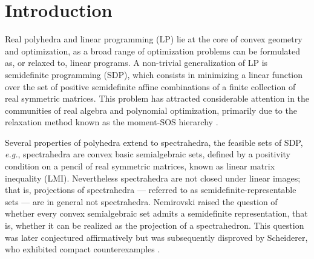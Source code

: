 \documentclass[sigconf]{acmart}
\begin{document}



\maketitle

\section{Introduction}
\label{sec:intro}

Real polyhedra and linear programming (LP) lie at the core
of convex geometry and optimization, as a broad range
of optimization problems can be formulated as, or relaxed to, linear programs.
A non-trivial generalization of LP is semidefinite programming (SDP),
which consists in minimizing a linear function over the set of
positive semidefinite affine combinations of a finite collection of
real symmetric matrices.
This problem has attracted considerable attention in the
communities of real algebra and polynomial optimization,
primarily due to the relaxation method known as the moment-SOS hierarchy
\cite{henrion2020moment}.

Several properties of polyhedra extend to spectrahedra, the feasible
sets of SDP, {\it e.g.}, spectrahedra are convex basic semialgebraic sets,
defined by a positivity condition on a pencil of real symmetric matrices,
known as linear matrix inequality (LMI).
Nevertheless spectrahedra are not closed under linear images; that is,
projections of spectrahedra --- referred to as semidefinite-representable sets ---
are in general not spectrahedra. Nemirovski
\cite{nemirovski2007advances} raised the question of whether every convex semialgebraic set admits
a semidefinite representation, that is, whether it can be realized as the projection
of a spectrahedron. This question was later conjectured affirmatively \cite{helton_sufficient_2008} 
but was subsequently disproved by Scheiderer, who
exhibited compact counterexamples \cite{scheiderer_spectrahedral_2017}.
\end{document}
